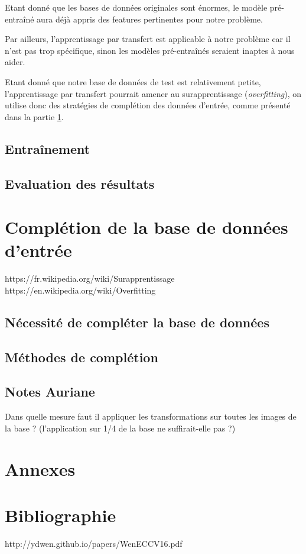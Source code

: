 \documentclass[a4paper,11pt]{article}
\begin{document}
Etant donné que les bases de données originales sont énormes, le modèle pré-entraîné aura déjà appris des features pertinentes pour notre problème.

Par ailleurs, l'apprentissage par transfert est applicable à notre problème car il n'est pas trop spécifique, sinon les modèles pré-entraînés seraient inaptes à nous aider.

Etant donné que notre base de données de test est relativement petite, l'apprentissage par transfert pourrait amener au surapprentissage (\textit{overfitting}), on utilise donc des stratégies de complétion des données d'entrée, comme présenté dans la partie \ref{sec:completion}.

\subsection{Entraînement}
\subsection{Evaluation des résultats}

\section{Complétion de la base de données d'entrée}
\label{sec:completion}

https://fr.wikipedia.org/wiki/Surapprentissage \\
https://en.wikipedia.org/wiki/Overfitting

\subsection{Nécessité de compléter la base de données}
\subsection{Méthodes de complétion}
    \subsection{Notes Auriane}
    Dans quelle mesure faut il appliquer les transformations sur toutes les images de la base ?
    (l'application sur 1/4 de la base ne suffirait-elle pas ?)

\section{Annexes}
\section{Bibliographie}
http://ydwen.github.io/papers/WenECCV16.pdf
\end{document}
